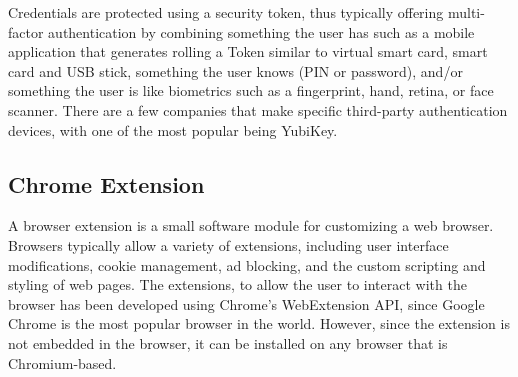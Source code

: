 Credentials are protected using a security token, thus typically offering multi-factor authentication by combining something the user has such as a mobile application that generates rolling a Token similar to virtual smart card, smart card and USB stick, something the user knows (PIN or password), and/or
something the user is like biometrics such as a fingerprint, hand, retina, or face scanner.
There are a few companies that make specific third-party authentication devices, with one of the most popular being YubiKey.

\subsection{Chrome Extension}

A browser extension is a small software module for customizing a web browser. Browsers typically allow a variety of extensions, including user interface modifications, cookie management, ad blocking, and the custom scripting and styling of web pages.
The extensions, to allow the user to interact with the browser has been developed using Chrome's WebExtension API, since Google Chrome is the most popular browser in the world. However, since the extension is not embedded in the browser, it can be installed on any browser that is Chromium-based.
